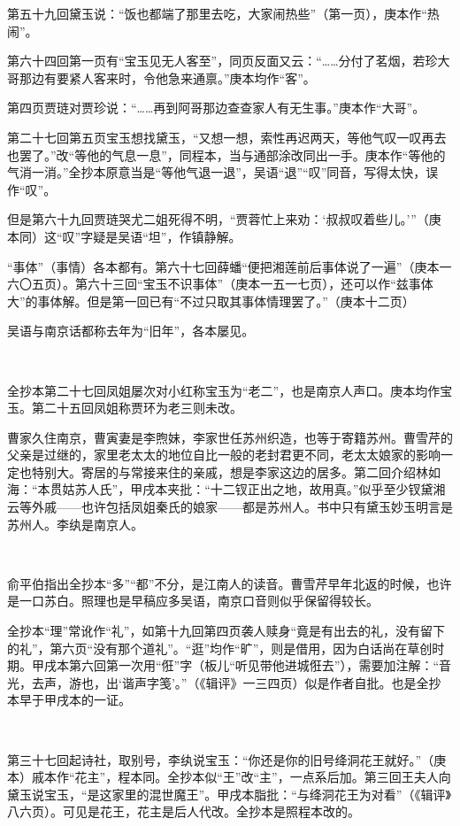 \par 第五十九回黛玉说：“饭也都端了那里去吃，大家闹热些”（第一页），庚本作“热闹”。
\par 第六十四回第一页有“宝玉见无人客至”，同页反面又云：“……分付了茗烟，若珍大哥那边有要紧人客来时，令他急来通禀。”庚本均作“客”。
\par 第四页贾琏对贾珍说：“……再到阿哥那边查查家人有无生事。”庚本作“大哥”。
\par 第二十七回第五页宝玉想找黛玉，“又想一想，索性再迟两天，等他气叹一叹再去也罢了。”改“等他的气息一息”，同程本，当与通部涂改同出一手。庚本作“等他的气消一消。”全抄本原意当是“等他气退一退”，吴语“退”“叹”同音，写得太快，误作“叹”。
\par 但是第六十九回贾琏哭尤二姐死得不明，“贾蓉忙上来劝：‘叔叔叹着些儿。'”（庚本同）这“叹”字疑是吴语“坦”，作镇静解。
\par “事体”（事情）各本都有。第六十七回薛蟠“便把湘莲前后事体说了一遍”（庚本一六〇五页）。第六十三回“宝玉不识事体”（庚本一五一七页），还可以作“兹事体大”的事体解。但是第一回已有“不过只取其事体情理罢了。”（庚本十二页）
\par 吴语与南京话都称去年为“旧年”，各本屡见。
\par  
\par 全抄本第二十七回凤姐屡次对小红称宝玉为“老二”，也是南京人声口。庚本均作宝玉。第二十五回凤姐称贾环为老三则未改。
\par 曹家久住南京，曹寅妻是李煦妹，李家世任苏州织造，也等于寄籍苏州。曹雪芹的父亲是过继的，家里老太太的地位自比一般的老封君更不同，老太太娘家的影响一定也特别大。寄居的与常接来住的亲戚，想是李家这边的居多。第二回介绍林如海：“本贯姑苏人氏”，甲戌本夹批：“十二钗正出之地，故用真。”似乎至少钗黛湘云等外戚——也许包括凤姐秦氏的娘家——都是苏州人。书中只有黛玉妙玉明言是苏州人。李纨是南京人。
\par  
\par 俞平伯指出全抄本“多”“都”不分，是江南人的读音。曹雪芹早年北返的时候，也许是一口苏白。照理也是早稿应多吴语，南京口音则似乎保留得较长。
\par 全抄本“理”常讹作“礼”，如第十九回第四页袭人赎身“竟是有出去的礼，没有留下的礼”，第六页“没有那个道礼”。“逛”均作“旷”，则是借用，因为白话尚在草创时期。甲戌本第六回第一次用“俇”字（板儿“听见带他进城俇去”），需要加注解：“音光，去声，游也，出‘谐声字笺’。”（《辑评》一三四页）似是作者自批。也是全抄本早于甲戌本的一证。
\par  
\par 第三十七回起诗社，取别号，李纨说宝玉：“你还是你的旧号绛洞花王就好。”（庚本）戚本作“花主”，程本同。全抄本似“王”改“主”，一点系后加。第三回王夫人向黛玉说宝玉，“是这家里的混世魔王”。甲戌本脂批：“与绛洞花王为对看”（《辑评》八六页）。可见是花王，花主是后人代改。全抄本是照程本改的。
